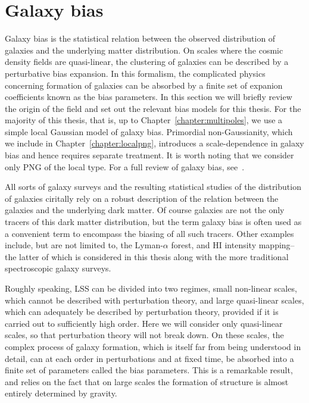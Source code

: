 \section{Galaxy bias}
\label{section:galaxybias}

Galaxy bias is the statistical relation between the observed distribution of galaxies and the underlying matter distribution. On scales where the cosmic density fields are quasi-linear, the clustering of galaxies can be described by a perturbative bias expansion. In this formalism, the complicated physics concerning formation of galaxies can be absorbed by a finite set of expanion coefficients known as the bias parameters. In this section we will briefly review the origin of the field and set out the relevant bias models for this thesis. For the majority of this thesis, that is, up to Chapter~\ref{chapter:multipoles}, we use a simple local Gaussian model of galaxy bias. Primordial non-Gaussianity, which we include in Chapter~\ref{chapter:localpng}, introduces a scale-dependence in galaxy bias and hence requires separate treatment. It is worth noting that we consider only PNG of the local type. For a full review of galaxy bias, see~\cite{Desjacques:2016bnm}.

All sorts of galaxy surveys and the resulting statistical studies of the distribution of galaxies ciritally rely on a robust description of the relation between the galaxies and the underlying dark matter. Of course galaxies are not the only tracers of this dark matter distribution, but the term galaxy bias is often used as a convenient term to encompass the biasing of all such tracers. Other examples include, but are not limited to, the Lyman-$\alpha$ forest, and HI intensity mapping-- the latter of which is considered in this thesis along with the more traditional spectroscopic galaxy surveys. 

Roughly speaking, LSS can be divided into two regimes, small non-linear scales, which cannot be described with perturbation theory, and large quasi-linear scales, which can adequately be described by perturbation theory, provided if it is carried out to sufficiently high order. Here we will consider only quasi-linear scales, so that perturbation theory will not break down. On these scales, the complex process of galaxy formation, which is itself far from being understood in detail, can at each order in perturbations and at fixed time, be absorbed into a finite set of parameters called the bias parameters. This is a remarkable result, and relies on the fact that on large scales the formation of structure is almost entirely determined by gravity. 

